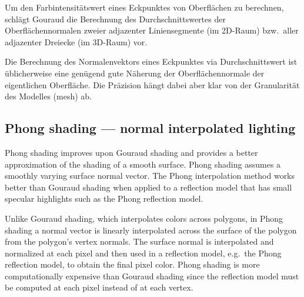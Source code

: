 Um den Farbintensitätswert eines Eckpunktes von Oberflächen  zu berechnen,
schlägt Gouraud die Berechnung des Durchschnittswertes der Oberflächennormalen
zweier adjazenter Liniensegmente (im 2D-Raum) bzw.\  aller adjazenter Dreiecke
(im 3D-Raum) vor.


Die Berechnung des Normalenvektors eines Eckpunktes via Durchschnittswert ist
üblicherweise eine genügend gute Näherung der Oberflächennormale der
eigentlichen Oberfläche. Die Präzision hängt dabei aber klar von der
Granularität des Modelles (mesh) ab.

\subsection{Phong shading --- normal interpolated lighting}
\label{subsec:phong_shading}


Phong shading improves upon Gouraud shading and provides a better approximation
of the shading of a smooth surface. Phong shading assumes a smoothly varying
surface normal vector. The Phong interpolation method works better than Gouraud
shading when applied to a reflection model that has small specular highlights
such as the Phong reflection model.

Unlike Gouraud shading, which interpolates colors across polygons, in Phong
shading a normal vector is linearly interpolated across the surface of the
polygon from the polygon's vertex normals. The surface normal is interpolated
and normalized at each pixel and then used in a reflection model, e.g.\ the
Phong reflection model, to obtain the final pixel color. Phong shading is more
computationally expensive than Gouraud shading since the reflection model must
be computed at each pixel instead of at each vertex.
